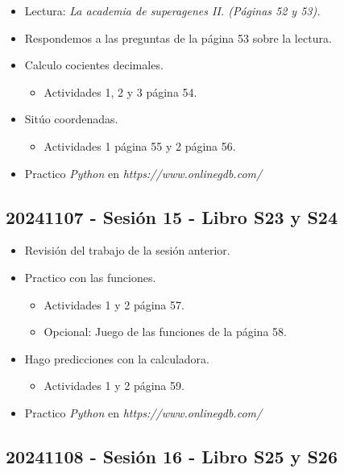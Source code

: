 \documentclass[a4paper,12pt]{article}
\begin{document}
\begin{itemize}
    \item Lectura: \textit{La academia de superagenes II. (Páginas 52 y 53).}
    \item Respondemos a las preguntas de la página 53 sobre la lectura.
    \item Calculo cocientes decimales.
    \begin{itemize}
        \item Actividades 1, 2 y 3 página 54.
    \end{itemize}
    \item Sitúo coordenadas.
    \begin{itemize}
        \item Actividades 1 página 55 y 2 página 56.
    \end{itemize}
    \item Practico \textit{Python} en \textit{https://www.onlinegdb.com/}
\end{itemize}

\subsection{20241107 - Sesión 15 - Libro S23 y S24}

\begin{itemize}
    \item Revisión del trabajo de la sesión anterior.
    \item Practico con las funciones.
    \begin{itemize}
        \item Actividades 1 y 2 página 57.
        \item Opcional: Juego de las funciones de la página 58.
    \end{itemize}
    \item Hago predicciones con la calculadora.
    \begin{itemize}
        \item Actividades 1 y 2 página 59.
    \end{itemize} 
    \item Practico \textit{Python} en \textit{https://www.onlinegdb.com/}
\end{itemize}

\subsection{20241108 - Sesión 16 - Libro S25 y S26}
\end{document}

